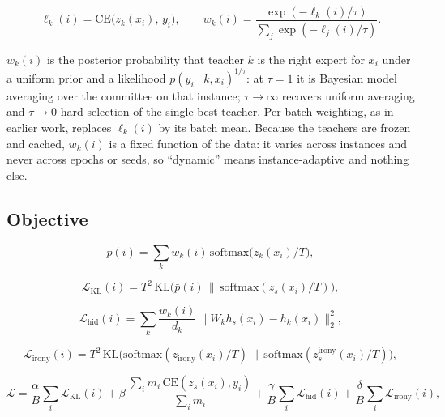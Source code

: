 \begin{equation}
\ell_k(i) = \mathrm{CE}\big(z_k(x_i),\, y_i\big), \qquad
w_k(i) = \frac{\exp(-\ell_k(i)/\tau)}{\sum_{j} \exp(-\ell_j(i)/\tau)} .
\end{equation}

$w_k(i)$ is the posterior probability that teacher $k$ is the right expert for $x_i$ under a uniform
prior and a likelihood $p(y_i \mid k, x_i)^{1/\tau}$: at $\tau = 1$ it is Bayesian model averaging
over the committee on that instance; $\tau \to \infty$ recovers uniform averaging and $\tau \to 0$
hard selection of the single best teacher. Per-batch weighting, as in earlier work, replaces
$\ell_k(i)$ by its batch mean. Because the teachers are frozen and cached, $w_k(i)$ is a fixed
function of the data: it varies across instances and never across epochs or seeds, so ``dynamic''
means instance-adaptive and nothing else.
\subsection{Objective}
\label{sec:3.3}
\begin{equation}
\bar p(i) = \sum_k w_k(i)\, \mathrm{softmax}\!\big(z_k(x_i)/T\big),
\end{equation}

\begin{equation}
\mathcal{L}_{\mathrm{KL}}(i) = T^2\, \mathrm{KL}\!\big(\bar p(i)\,\|\,\mathrm{softmax}(z_s(x_i)/T)\big),
\end{equation}

\begin{equation}
\mathcal{L}_{\mathrm{hid}}(i) = \sum_k \frac{w_k(i)}{d_k}\, \big\| W_k h_s(x_i) - h_k(x_i) \big\|_2^2,
\end{equation}

\begin{equation}
\mathcal{L}_{\mathrm{irony}}(i) = T^2\, \mathrm{KL}\!\big(\mathrm{softmax}(z_{\text{irony}}(x_i)/T)\,\|\,\mathrm{softmax}(z_s^{\text{irony}}(x_i)/T)\big),
\end{equation}

\begin{equation}
\mathcal{L} = \frac{\alpha}{B}\sum_i \mathcal{L}_{\mathrm{KL}}(i)
 + \beta\, \frac{\sum_i m_i\, \mathrm{CE}(z_s(x_i), y_i)}{\sum_i m_i}
 + \frac{\gamma}{B}\sum_i \mathcal{L}_{\mathrm{hid}}(i) + \frac{\delta}{B}\sum_i \mathcal{L}_{\mathrm{irony}}(i),
\end{equation}

